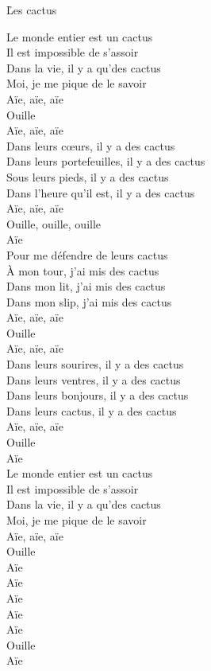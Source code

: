 \documentclass{novel}
\begin{document}
{\begin{minipage}[t][0.5\textheight][t]{\textwidth}
\vspace{0.00\textheight}
\h*{Les cactus}
\begin{multicols}{2}

Le monde entier est un cactus \\
Il est impossible de s'assoir \\
Dans la vie, il y a qu'des cactus \\
Moi, je me pique de le savoir \\

Aïe, aïe, aïe \\
Ouille \\
Aïe, aïe, aïe \\

Dans leurs cœurs, il y a des cactus \\
Dans leurs portefeuilles, il y a des cactus \\
Sous leurs pieds, il y a des cactus \\
Dans l'heure qu'il est, il y a des cactus \\

Aïe, aïe, aïe \\
Ouille, ouille, ouille \\
Aïe \\

Pour me défendre de leurs cactus \\
À mon tour, j'ai mis des cactus \\
Dans mon lit, j'ai mis des cactus \\
Dans mon slip, j'ai mis des cactus \\

Aïe, aïe, aïe \\
Ouille \\
Aïe, aïe, aïe \\

Dans leurs sourires, il y a des cactus \\
Dans leurs ventres, il y a des cactus \\
Dans leurs bonjours, il y a des cactus \\
Dans leurs cactus, il y a des cactus \\

Aïe, aïe, aïe \\
Ouille \\
Aïe \\

Le monde entier est un cactus \\
Il est impossible de s'assoir \\
Dans la vie, il y a qu'des cactus \\
Moi, je me pique de le savoir \\
Aïe, aïe, aïe \\
Ouille \\
Aïe \\
Aïe \\
Aïe \\
Aïe \\
Aïe \\
Ouille \\
Aïe
\end{multicols}
\end{minipage}
}
\end{document}
